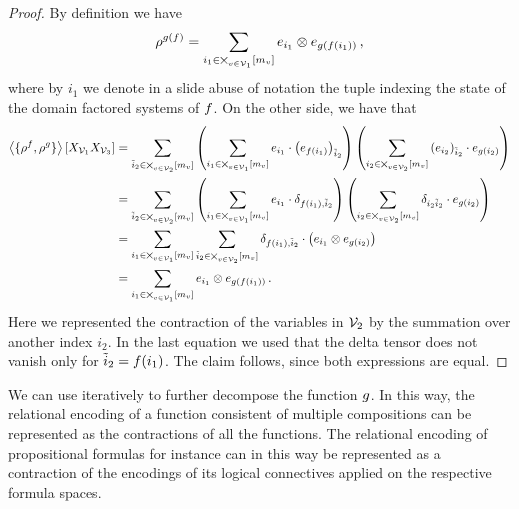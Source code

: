 \begin{proof}
	By definition we have
	\begin{align*}
		\rho^{g(f)} = \sum_{i_1 \in \bigtimes_{v\in\mathcal{V}_1} [m_{v}]} e_{i_1} \otimes e_{g(f(i_1))} \, ,
	\end{align*}
	where by $i_1$ we denote in a slide abuse of notation the tuple indexing the state of the domain factored systems of $f$.
	On the other side, we have that
	\begin{align*}
	 	\left\langle \{\rho^{f},\rho^{g}\}\right\rangle \left[ X_{\mathcal{V}_1}X_{\mathcal{V}_3} \right] 
		& =
		\sum_{\tilde{i}_2 \in \bigtimes_{v\in\mathcal{V}_2}[m_{v}]} 
		\left( \sum_{i_1 \in \bigtimes_{v\in\mathcal{V}_1}[m_{v}]}  e_{i_1} \cdot \left(e_{f(i_1)}\right)_{\tilde{i}_2} \right)
		\left( \sum_{i_2 \in \bigtimes_{v\in\mathcal{V}_2}[m_{v}]}  \left(e_{i_2}\right)_{\tilde{i}_2} \cdot e_{g(i_2)} \right) \\
		& = 
		\sum_{\tilde{i}_2 \in \bigtimes_{v\in\mathcal{V}_2}[m_{v}]} 
		\left( \sum_{i_1 \in \bigtimes_{v\in\mathcal{V}_1}[m_{v}]}  e_{i_1} \cdot \delta_{f(i_1),\tilde{i}_2} \right)
		\left( \sum_{i_2 \in \bigtimes_{v\in\mathcal{V}_2}[m_{v}]}  \delta_{i_2 \tilde{i}_2} \cdot e_{g(i_2)} \right) \\
		& = 
		\sum_{i_1 \in \bigtimes_{v\in\mathcal{V}_1}[m_{v}]}
		\sum_{\tilde{i}_2 \in \bigtimes_{v\in\mathcal{V}_2}[m_{v}]}  \delta_{f(i_1),\tilde{i}_2} \cdot \left(  e_{i_1}   \otimes e_{g(i_2)} \right) \\
		& = 
		\sum_{i_1 \in \bigtimes_{v\in\mathcal{V}_1} [m_{v}]} 
		e_{i_1} \otimes e_{g(f(i_1))} \, .
	\end{align*}
	Here we represented the contraction of the variables in $\mathcal{V}_2$ by the summation over another index $i_2$.
	In the last equation we used that the delta tensor does not vanish only for $\tilde{i}_2= f(i_1)$.
	The claim follows, since both expressions are equal.
\end{proof}

We can use  iteratively to further decompose the function $g$.
In this way, the relational encoding of a function consistent of multiple compositions can be represented as the contractions of all the functions.
The relational encoding of propositional formulas for instance can in this way be represented as a contraction of the encodings of its logical connectives applied on the respective formula spaces. 




